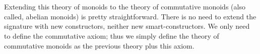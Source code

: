 \begin{code}
\>[4]\AgdaSpace{}%
\AgdaSymbol{=}\AgdaSpace{}%
\AgdaSpace{}%
\AgdaSymbol{(}\AgdaSpace{}%
\AgdaSpace{}%
\AgdaSymbol{)}\AgdaSpace{}%
\AgdaSpace{}%
\AgdaSpace{}%
\AgdaSpace{}%
\AgdaSymbol{(}\AgdaSpace{}%
\AgdaSpace{}%
\AgdaSymbol{(}\AgdaSpace{}%
\AgdaSpace{}%
\AgdaSymbol{))}\<%
\\
%
\\[\AgdaEmptyExtraSkip]%
%
\>[4]\AgdaSpace{}%
\AgdaSymbol{=}\AgdaSpace{}%
\AgdaSpace{}%
\AgdaSpace{}%
\AgdaSpace{}%
\AgdaSpace{}%
\AgdaSpace{}%
\<%
\\
%
\\[\AgdaEmptyExtraSkip]%
%
\>[4]\AgdaSpace{}%
\AgdaSymbol{=}\AgdaSpace{}%
\AgdaSpace{}%
\AgdaSpace{}%
\AgdaSpace{}%
\AgdaSpace{}%
\AgdaSpace{}%
\<%
\\
%
\\[\AgdaEmptyExtraSkip]%
%
\>[4]%
\>[15]\AgdaSymbol{:}\AgdaSpace{}%
\AgdaSpace{}%
\AgdaSpace{}%
\AgdaSymbol{(}\AgdaSpace{}%
\AgdaSpace{}%
\AgdaSpace{}%
\AgdaSpace{}%
\AgdaOperator{\AgdaFunction{[}}\AgdaSpace{}%
\AgdaSpace{}%
\AgdaOperator{\AgdaFunction{]}}\AgdaSymbol{)}\<%
\\
%
\>[4]\AgdaSpace{}%
\AgdaSymbol{=}\AgdaSpace{}%
\AgdaSpace{}%
\AgdaSpace{}%
\AgdaSymbol{(}\AgdaSpace{}%
\AgdaSpace{}%
\AgdaSpace{}%
\AgdaSpace{}%
\AgdaSymbol{)}\<%
\end{code}

\noindent
Extending this theory of monoids to the theory of commutative monoids (also
called, abelian monoids) is pretty straightforward. There is no need to extend
the signature with new constructors, neither new smart-constructors. We only
need to define the commutative axiom; thus we simply define the theory of
commutative monoids as the previous theory plus this axiom.

